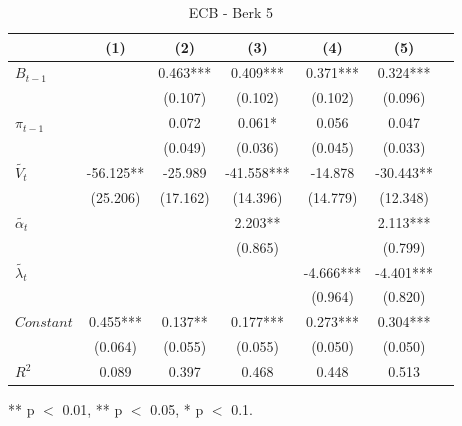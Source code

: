 \documentclass[review]{elsarticle}
\begin{document}
\begin{table}[!ht]
\centering 
  \caption{ECB - Berk 5} 
  \label{tab:ECB - Berk 5}
\begin{tabular}{l*{6}{c}}   
\toprule
                    & (1) & (2) & (3) & (4) & (5) \\
\midrule
$B_{t-1}$           &     & 0.463*** & 0.409*** & 0.371*** & 0.324*** \\
                    &     & (0.107) & (0.102) & (0.102) & (0.096) \\
$\pi_{t-1}$         &     & 0.072 & 0.061* & 0.056 & 0.047 \\
                    &     & (0.049) & (0.036) & (0.045) & (0.033) \\
$\tilde{V_t}$       & -56.125** & -25.989 & -41.558*** & -14.878 & -30.443** \\
                    & (25.206) & (17.162) & (14.396) & (14.779) & (12.348) \\
$\tilde{\alpha_t}$  &     &     & 2.203** &     & 2.113*** \\
                    &     &     & (0.865) &     & (0.799) \\
$\tilde{\lambda_t}$ &     &     &     & -4.666*** & -4.401*** \\
                    &     &     &     & (0.964) & (0.820) \\
$Constant$          & 0.455*** & 0.137** & 0.177*** & 0.273*** & 0.304*** \\
                    & (0.064) & (0.055) & (0.055) & (0.050) & (0.050) \\
\midrule
$R^2$               & 0.089 & 0.397 & 0.468 & 0.448 & 0.513 \\
\bottomrule
\end{tabular} 
\parbox{0.8\textwidth}{\centering \small *** p $<$ 0.01, ** p $<$ 0.05, * p $<$ 0.1.}
\end{table}
\end{document}

